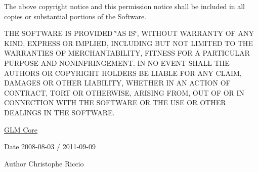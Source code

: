 The above copyright notice and this permission notice shall be included in all copies or substantial portions of the Software.

T\+H\+E S\+O\+F\+T\+W\+A\+R\+E I\+S P\+R\+O\+V\+I\+D\+E\+D \char`\"{}\+A\+S I\+S\char`\"{}, W\+I\+T\+H\+O\+U\+T W\+A\+R\+R\+A\+N\+T\+Y O\+F A\+N\+Y K\+I\+N\+D, E\+X\+P\+R\+E\+S\+S O\+R I\+M\+P\+L\+I\+E\+D, I\+N\+C\+L\+U\+D\+I\+N\+G B\+U\+T N\+O\+T L\+I\+M\+I\+T\+E\+D T\+O T\+H\+E W\+A\+R\+R\+A\+N\+T\+I\+E\+S O\+F M\+E\+R\+C\+H\+A\+N\+T\+A\+B\+I\+L\+I\+T\+Y, F\+I\+T\+N\+E\+S\+S F\+O\+R A P\+A\+R\+T\+I\+C\+U\+L\+A\+R P\+U\+R\+P\+O\+S\+E A\+N\+D N\+O\+N\+I\+N\+F\+R\+I\+N\+G\+E\+M\+E\+N\+T. I\+N N\+O E\+V\+E\+N\+T S\+H\+A\+L\+L T\+H\+E A\+U\+T\+H\+O\+R\+S O\+R C\+O\+P\+Y\+R\+I\+G\+H\+T H\+O\+L\+D\+E\+R\+S B\+E L\+I\+A\+B\+L\+E F\+O\+R A\+N\+Y C\+L\+A\+I\+M, D\+A\+M\+A\+G\+E\+S O\+R O\+T\+H\+E\+R L\+I\+A\+B\+I\+L\+I\+T\+Y, W\+H\+E\+T\+H\+E\+R I\+N A\+N A\+C\+T\+I\+O\+N O\+F C\+O\+N\+T\+R\+A\+C\+T, T\+O\+R\+T O\+R O\+T\+H\+E\+R\+W\+I\+S\+E, A\+R\+I\+S\+I\+N\+G F\+R\+O\+M, O\+U\+T O\+F O\+R I\+N C\+O\+N\+N\+E\+C\+T\+I\+O\+N W\+I\+T\+H T\+H\+E S\+O\+F\+T\+W\+A\+R\+E O\+R T\+H\+E U\+S\+E O\+R O\+T\+H\+E\+R D\+E\+A\+L\+I\+N\+G\+S I\+N T\+H\+E S\+O\+F\+T\+W\+A\+R\+E.

\hyperlink{group__core}{G\+L\+M Core}

\begin{DoxyDate}{Date}
2008-\/08-\/03 / 2011-\/09-\/09 
\end{DoxyDate}
\begin{DoxyAuthor}{Author}
Christophe Riccio 
\end{DoxyAuthor}
